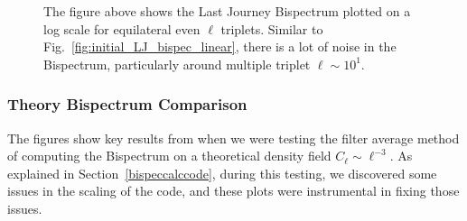 \documentclass[11pt]{article}
\renewcommand{\_}[1]{\underline{ #1 }}
\begin{document}
{\begin{figure}[H]
    \centering
    \caption{The figure above shows the Last Journey Bispectrum plotted on a log scale for equilateral even $\ell$ triplets. Similar to Fig.~\ref{fig:initial_LJ_bispec_linear}, there is a lot of noise in the Bispectrum, particularly around multiple triplet $\ell \sim 10^1$.}\label{fig:initial_LJ_bispec_log}
\end{figure}

\subsubsection{Theory Bispectrum Comparison}\label{theorybispecplots}

The figures show key results from when we were testing the filter average method of computing the Bispectrum on a theoretical density field $C_{\ell} \sim \ell^{-3}$. As explained in Section~\ref{bispeccalccode}, during this testing, we discovered some issues in the scaling of the code, and these plots were instrumental in fixing those issues.

}
\end{document}
